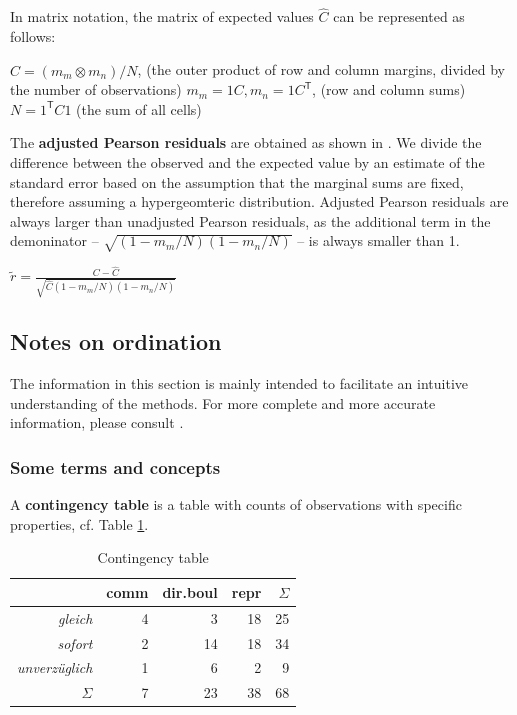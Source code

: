\begin{paperappendix}
In matrix notation, the matrix of expected values $\hat{C}$ can be
represented as follows:

\begin{exe}
  \ex\label{PearsonDef}
  \begin{xlist}
    \ex $\hat{C}=(m_m\otimes m_n)/N$, (the outer product of row and
    column margins, divided by the number of
    observations) %
    \ex   $m_m=1C, m_n=1C^\mathsf{T}$, (row and column sums)
    \ex   $N=1^\mathsf{T} C1$ (the sum of all cells)
  \end{xlist}
\end{exe}
%
The \textbf{adjusted Pearson residuals} are obtained 
as shown in . We divide the difference between the
observed and the expected value by an estimate of the standard error
based on the assumption that the marginal sums are fixed, therefore
assuming a hypergeomteric distribution. Adjusted Pearson residuals are
always larger than unadjusted Pearson residuals, as the additional
term in the demoninator -- $\sqrt{(1-m_m/N)(1-m_n/N)}$ -- is always
smaller than 1.

\begin{exe}
  \ex\label{adjresid} $\tilde{r}=\frac{C-\hat{C}}{\sqrt{\hat{C}(1-m_m/N)(1-m_n/N)}}$
\end{exe}

\subsection{Notes on ordination}\label{sec:AppOrdination}

The information in this section is mainly intended to facilitate an
intuitive understanding of the methods. For more complete and more
accurate information, please consult \citet{Greenacre2016}.

\subsubsection*{Some terms and concepts}

A \textbf{contingency table} is a table with counts of observations
with specific properties, cf. Table \ref{tab:contingency}.

\begin{table}[ht]
\centering
\begin{tabular}{r|rrr|r}
  \hline
 & comm & dir.boul & repr & $\Sigma$\\ 
  \hline
  \textit{gleich}       &   4 &   3 &  18 & 25      \\ 
  \textit{sofort}       &   2 &  14 &  18 & 34\\ 
  \textit{unverzüglich} &   1 &   6 &   2 & 9 \\\hline
  $\Sigma$       &   7 &  23 &  38 & 68 \\
   \hline
\end{tabular}
\caption{Contingency table}
\label{tab:contingency}
\end{table}


\end{paperappendix}

